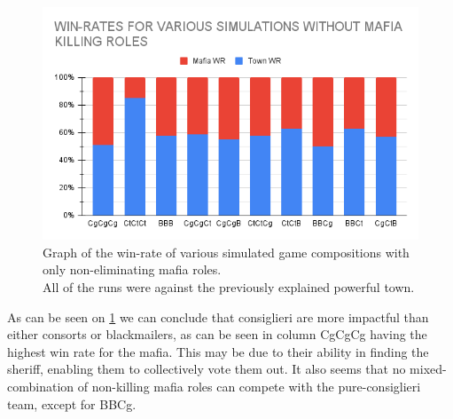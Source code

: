 \begin{figure}[H]
    \includegraphics[width=1\linewidth]{figures/Winrates_NonKilling}
    \caption{Graph of the win-rate of various
        simulated game compositions with only
        non-eliminating mafia roles.\\
        All of the runs were against the previously explained powerful town.}
    \label{fig:VariousSimulationsNonKilling}
\end{figure}
\vspace{-5px} As can be seen on \cref{fig:VariousSimulationsNonKilling} we can conclude that
consiglieri are more impactful than either consorts or blackmailers, as can be seen in column CgCgCg having the highest win rate for the mafia. This may
be due to their ability in finding the sheriff, enabling them to
collectively vote them out. It also seems that no mixed-combination of
non-killing mafia roles can compete with the pure-consiglieri team, except for BBCg.
